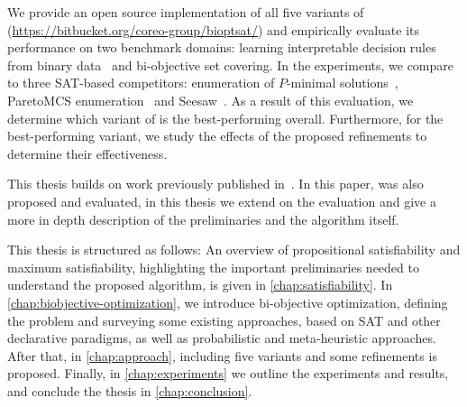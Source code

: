 We provide an open source implementation of all five variants of \algname{} ({\small\url{https://bitbucket.org/coreo-group/bioptsat/}}) and empirically evaluate its performance on two benchmark domains:
learning interpretable decision rules from binary data~\autocite{DBLP:conf/cp/MaliotovM18} and bi-objective set covering.
In the experiments, we compare \algname{} to three SAT-based competitors:
enumeration of $P$-minimal solutions~\autocite{DBLP:conf/cp/SohBTB17}, ParetoMCS enumeration~\autocite{DBLP:conf/ijcai/Terra-NevesLM18a} and Seesaw~\autocite{DBLP:conf/cp/JanotaMSM21}.
As a result of this evaluation, we determine which variant of \algname{} is the best-performing overall.
Furthermore, for the best-performing variant, we study the effects of the proposed refinements to determine their effectiveness.

This thesis builds on work previously published in~\autocite{JabsEtAl2022MaxSATBasedBi}.
In this paper, \algname{} was also proposed and evaluated, in this thesis we extend on the evaluation and give a more in depth description of the preliminaries and the algorithm itself.

This thesis is structured as follows:
An overview of propositional satisfiability and maximum satisfiability, highlighting the important preliminaries needed to understand the proposed algorithm, is given in \cref{chap:satisfiability}.
In \cref{chap:biobjective-optimization}, we introduce bi-objective optimization, defining the problem and surveying some existing approaches, based on SAT and other declarative paradigms, as well as probabilistic and meta-heuristic approaches.
After that, in \cref{chap:approach}, \algname{} including five variants and some refinements is proposed.
Finally, in \cref{chap:experiments} we outline the experiments and results, and conclude the thesis in \cref{chap:conclusion}.